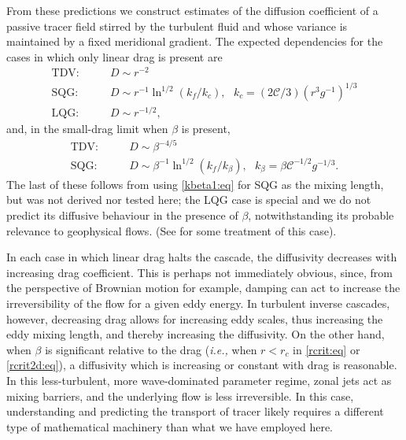 \documentclass{jfm}
\newcommand{\ie}  {\textit{i.e., }}
\newcommand{\ca}  [1]{\mathcal{#1}}
\begin{document}
From these predictions we construct estimates of the diffusion
coefficient of a passive tracer field stirred by the turbulent fluid
and whose variance is maintained by a fixed meridional gradient.  The
expected dependencies for the cases in which only linear drag is
present are
\begin{subequations}
\begin{align}
\textrm{TDV:}
\qquad & D \sim r^{-2}\nonumber\\
\textrm{SQG:}
\qquad & D \sim r^{-1} \ln^{1/2}(k_f/k_c)\nonumber, ~~~
k_c = \left(2\ca{C}/3\right)\left(r^3g^{-1}\right)^{1/3}\\
\textrm{LQG:}
\qquad & D \sim r^{-1/2},\nonumber
\end{align}
\end{subequations}
and, in the small-drag limit when $\beta$ is present,
\begin{subequations}
\begin{align}
\textrm{TDV:}
\qquad & D \sim \beta^{-4/5}\nonumber\\
\textrm{SQG:}
\qquad & D \sim \beta^{-1}\ln^{1/2}(k_f/k_{\beta}), ~~~
k_{\beta} = \beta \ca{C}^{-1/2}g^{-1/3}.\nonumber
\end{align}
\end{subequations}
The last of these follows from using \eqref{kbeta1:eq} for SQG as the
mixing length, but was not derived nor tested here; the LQG case is
special and we do not predict its diffusive behaviour in the presence
of $\beta$, notwithstanding its probable relevance to geophysical
flows. (See \citet{kukharkin96} for some treatment of this case).

In each case in which linear drag halts the cascade, the diffusivity
decreases with increasing drag coefficient.  This is perhaps not
immediately obvious, since, from the perspective of Brownian motion
for example, damping can act to increase the irreversibility of the
flow for a given eddy energy.  In turbulent inverse cascades, however,
decreasing drag allows for increasing eddy scales, thus increasing the
eddy mixing length, and thereby increasing the diffusivity.  On the
other hand, when $\beta$ is significant relative to the drag (\ie when
$r<r_c$ in \eqref{rcrit:eq} or \eqref{rcrit2d:eq}), a diffusivity
which is increasing or constant with drag is reasonable.  In this
less-turbulent, more wave-dominated parameter regime, zonal jets act
as mixing barriers, and the underlying flow is less irreversible.  In
this case, understanding and predicting the transport of tracer likely
requires a different type of mathematical machinery than what we have
employed here.
\end{document}

